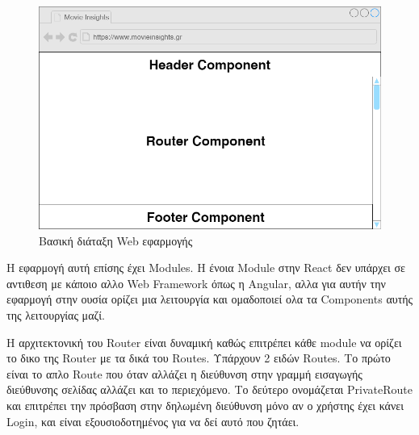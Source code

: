 \begin{figure}[h]
  \centering
  \includegraphics[width=145mm]{Chapters/5 - Architecture/Client/Images/main_struct.png}
  \caption{Βασική διάταξη Web εφαρμογής}
  \label{wire:main}
\end{figure}

Η εφαρμογή αυτή επίσης έχει Modules. Η ένοια Module στην React δεν υπάρχει σε αντιθεση με κάποιο αλλο Web Framework όπως η Angular, αλλα για αυτήν την εφαρμογή στην ουσία ορίζει μια λειτουργία και ομαδοποιεί ολα τα Components αυτής της λειτουργίας μαζί. 

Η αρχιτεκτονική του Router είναι δυναμική καθώς επιτρέπει κάθε module να ορίζει το δικο της Router με τα δικά του Routes. Υπάρχουν 2 ειδών Routes. Το πρώτο είναι το απλο Route που όταν αλλάζει η διεύθυνση στην γραμμή εισαγωγής διεύθυνσης σελίδας αλλάζει και το περιεχόμενο. Το δεύτερο ονομάζεται PrivateRoute και επιτρέπει την πρόσβαση στην δηλωμένη διεύθυνση μόνο αν ο χρήστης έχει κάνει Login, και είναι εξουσιοδοτημένος για να δεί αυτό που ζητάει. 


